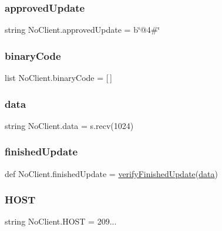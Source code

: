 \subsubsection{\texorpdfstring{approved\+Update}{approvedUpdate}}
{\footnotesize\ttfamily string No\+Client.\+approved\+Update = b\char`\"{}@4\#\char`\"{}}

\mbox{\label{namespaceNoClient_a40004afa65328c18891bec9feca29dad}} 
\subsubsection{\texorpdfstring{binary\+Code}{binaryCode}}
{\footnotesize\ttfamily list No\+Client.\+binary\+Code = \mbox{[}$\,$\mbox{]}}

\mbox{\label{namespaceNoClient_a3687413639bcde5799ea49121c61206d}} 
\subsubsection{\texorpdfstring{data}{data}}
{\footnotesize\ttfamily string No\+Client.\+data = s.\+recv(1024)}

\mbox{\label{namespaceNoClient_a408c6aa37feaeb4ce526cb6af66bdda2}} 
\subsubsection{\texorpdfstring{finished\+Update}{finishedUpdate}}
{\footnotesize\ttfamily def No\+Client.\+finished\+Update = \hyperlink{namespaceNoClient_ac97f6af869f1514eb8ce4f1b205c2bd5}{verify\+Finished\+Update}(\hyperlink{namespaceNoClient_a3687413639bcde5799ea49121c61206d}{data})}

\mbox{\label{namespaceNoClient_a6f89bd992508c504035304f4773518d3}} 
\subsubsection{\texorpdfstring{H\+O\+ST}{HOST}}
{\footnotesize\ttfamily string No\+Client.\+H\+O\+ST = \textquotesingle{}209...\textquotesingle{}}

